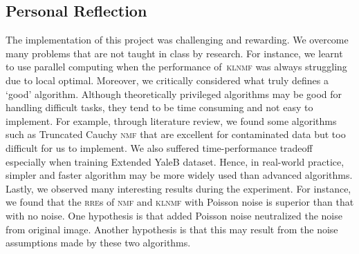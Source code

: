 \subsection{Personal Reflection}
The implementation of this project was challenging and rewarding. We overcome many problems that are not taught in class by research. For instance, we learnt to use parallel computing when the performance of~\textsc{klnmf} was always struggling due to local optimal. 
Moreover, we critically considered what truly defines a `good' algorithm. Although theoretically privileged algorithms may be good for handling difficult tasks, they tend to be time consuming and not easy to implement. For example, through literature review, we found some algorithms such as Truncated Cauchy \textsc{nmf} \citet{guan2017truncated} that are excellent for contaminated data but too difficult for us to implement. We also suffered time-performance tradeoff especially when training Extended YaleB dataset. Hence, in real-world practice, simpler and faster algorithm may be more widely used than advanced algorithms. 
Lastly, we observed many interesting results during the experiment. For instance, we found that the \textsc{rre}s of \textsc{nmf} and \textsc{klnmf} with Poisson noise is superior than that with no noise. One hypothesis is that added Poisson noise neutralized the noise from original image. Another hypothesis is that this may result from the noise assumptions made by these two algorithms. 

